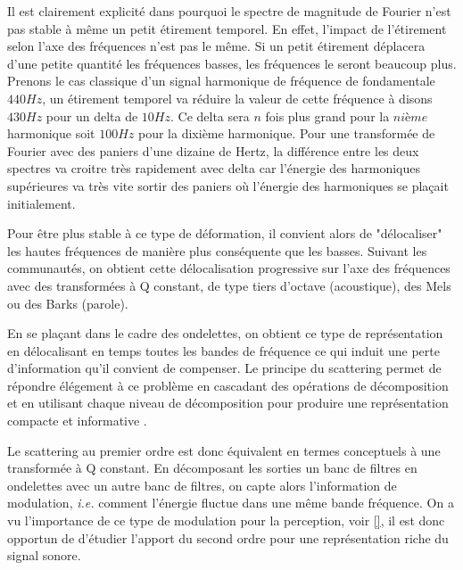 Il est clairement explicité dans \cite{anden2014deep} pourquoi le spectre de magnitude de Fourier n'est pas stable à même un petit étirement temporel. En effet, l'impact de l'étirement selon l'axe des fréquences n'est pas le même. Si un petit étirement déplacera d'une petite quantité les fréquences basses, les fréquences le seront beaucoup plus. Prenons le cas classique d'un signal harmonique de fréquence de fondamentale $440 Hz$, un étirement temporel va réduire la valeur de cette fréquence à disons $430 Hz$ pour un delta de $10 Hz$. Ce delta sera $n$ fois plus grand pour la $nième$ harmonique soit $100 Hz$ pour la dixième harmonique. Pour une transformée de Fourier avec des paniers d'une dizaine de Hertz, la différence entre les deux spectres va croitre très rapidement avec delta car l'énergie des harmoniques supérieures va très vite sortir des paniers où l'énergie des harmoniques se plaçait initialement.

Pour être plus stable à ce type de déformation, il convient alors de "délocaliser" les hautes fréquences de manière plus conséquente que les basses. Suivant les communautés, on obtient cette délocalisation progressive sur l'axe des fréquences avec des transformées à Q constant, de type tiers d'octave (acoustique), des Mels ou des Barks (parole).

En se plaçant dans le cadre des ondelettes, on obtient ce type de représentation en délocalisant en temps toutes les bandes de fréquence ce qui induit une perte d'information qu'il convient de compenser. Le principe du scattering permet de répondre élégement à ce problème en cascadant des opérations de décomposition et en utilisant chaque niveau de décomposition pour produire une représentation compacte et informative .

Le scattering au premier ordre est donc équivalent en termes conceptuels à une transformée à Q constant. En décomposant les sorties un banc de filtres en ondelettes avec un autre banc de filtres, on capte alors l'information de modulation, \textit{i.e.} comment l'énergie fluctue dans une même bande fréquence. On a vu l'importance de ce type de modulation pour la perception, voir \ref{}, il est donc opportun de d'étudier l'apport du second ordre pour une représentation riche du signal sonore.

